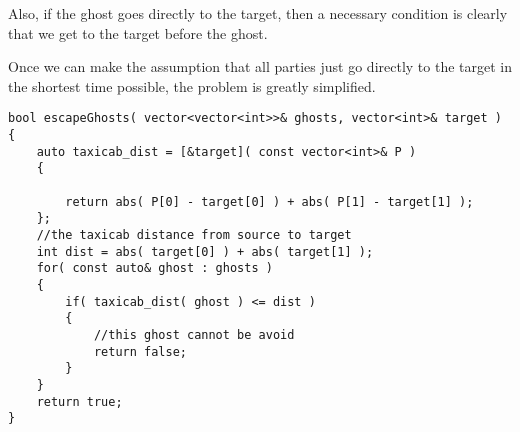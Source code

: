 Also, if the ghost goes directly to the target, then a necessary condition is clearly that we get to the target before the ghost.

Once we can make the assumption that all parties just go directly to the target in the shortest time possible, the problem is greatly simplified.

\setcounter{lstlisting}{0}
\begin{lstlisting}[style=customc, caption={Taxicab Distance}]
bool escapeGhosts( vector<vector<int>>& ghosts, vector<int>& target )
{
    auto taxicab_dist = [&target]( const vector<int>& P )
    {

        return abs( P[0] - target[0] ) + abs( P[1] - target[1] );
    };
    //the taxicab distance from source to target
    int dist = abs( target[0] ) + abs( target[1] );
    for( const auto& ghost : ghosts )
    {
        if( taxicab_dist( ghost ) <= dist )
        {
            //this ghost cannot be avoid
            return false;
        }
    }
    return true;
}
\end{lstlisting}